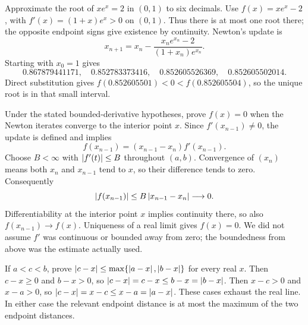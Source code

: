 \goal Approximate the root of $xe^x=2$ in $(0,1)$ to six decimals.
Use $f(x)=xe^x-2$, with $f'(x)=(1+x)e^x>0$ on $(0,1)$.
Thus there is at most one root there; the opposite endpoint signs give
existence by continuity. Newton's update is
\[
 x_{n+1}=x_n-\frac{x_ne^{x_n}-2}{(1+x_n)e^{x_n}}.
\]
Starting with $x_0=1$ gives
\[
 0.867879441171,\quad0.852783373416,\quad
 0.852605526369,\quad0.852605502014.
\]
Direct substitution gives $f(0.852605501)<0<f(0.852605504)$,
so the unique root is in that small interval.

\goal Under the stated bounded-derivative hypotheses, prove $f(x)=0$
when the Newton iterates converge to the interior point $x$.
Since $f'(x_{n-1})\ne0$, the update is defined and implies
\[
 f(x_{n-1})=(x_{n-1}-x_n)f'(x_{n-1}).
\]
Choose $B<\infty$ with $\left|f'(t)\right|\le B$ throughout $(a,b)$.
Convergence of $(x_n)$ means both $x_n$ and $x_{n-1}$ tend to $x$,
so their difference tends to zero. Consequently
\[
 \left|f(x_{n-1})\right|\le B\left|x_{n-1}-x_n\right|\longrightarrow0.
\]
Differentiability at the interior point $x$ implies continuity there,
so also $f(x_{n-1})\to f(x)$. Uniqueness of a real limit gives $f(x)=0$.
We did not assume $f'$ was continuous or bounded away from zero;
the boundedness from above was the estimate actually used.

\goal If $a<c<b$, prove $\left|c-x\right|\le\max\{\left|a-x\right|,\left|b-x\right|\}$
for every real $x$.
Then $c-x\ge0$ and $b-x>0$, so
$\left|c-x\right|=c-x\le b-x=\left|b-x\right|$.
Then $x-c>0$ and $x-a>0$, so
$\left|c-x\right|=x-c\le x-a=\left|a-x\right|$.
These cases exhaust the real line. In either case the relevant endpoint
distance is at most the maximum of the two endpoint distances.
